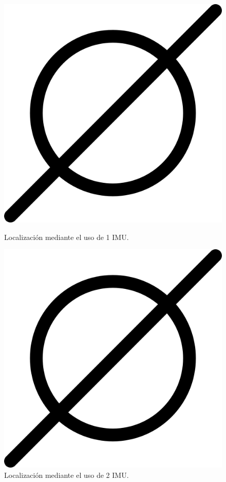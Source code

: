 \begin{figure}[htbp]
  \centering
  \begin{minipage}[b]{0.45\textwidth}
    \centering
    \includegraphics[width=\textwidth]{images/poner_foto.png}
    \caption{Localización mediante el uso de 1 IMU.}
    \label{fig:Localización_1imu}
  \end{minipage}
  \hfill
  \begin{minipage}[b]{0.45\textwidth}
    \centering
    \includegraphics[width=\textwidth]{images/poner_foto.png}
    \caption{Localización mediante el uso de 2 IMU.}
    \label{fig:localizacion_2imu}
  \end{minipage}
\end{figure}
\newpage
